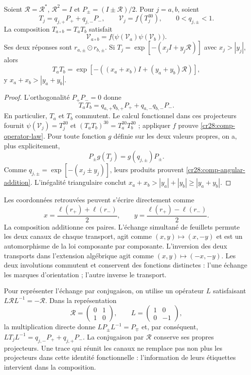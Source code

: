 \begin{proposition}
\label{cr28:comp-operator}
Soient $\mathcal R=\mathcal R^*$, $\mathcal R^2=I$ et
$P_\pm=(I\pm\mathcal R)/2$. Pour $j=a,b$, soient
\[
 T_j=q_{j,+}P_++q_{j,-}P_-,\qquad
 \mathcal V_j=f(T_j^{30}),\qquad 0<q_{j,\pm}<1.
\]
La composition $T_{a\circ b}=T_aT_b$ satisfait
\begin{equation}
 \mathcal V_{a\circ b}
 =f\bigl(\psi(\mathcal V_a)\psi(\mathcal V_b)\bigr).
 \label{cr28:comp-operator-law}
\end{equation}
Ses deux réponses sont $r_{a,\pm}\odot r_{b,\pm}$. Si
$T_j=\exp[-(x_jI+y_j\mathcal R)]$ avec $x_j>|y_j|$, alors
\begin{equation}
 T_aT_b=
 \exp[-((x_a+x_b)I+(y_a+y_b)\mathcal R)],
 \label{cr28:comp-angular-addition}
\end{equation}
y $x_a+x_b>|y_a+y_b|$.
\end{proposition}
\begin{proof}
L’orthogonalité $P_+P_-=0$ donne
\[
 T_aT_b=q_{a,+}q_{b,+}P_++q_{a,-}q_{b,-}P_-.
\]
En particulier, $T_a$ et $T_b$ commutent. Le calcul fonctionnel dans ces
projecteurs fournit
$\psi(\mathcal V_j)=T_j^{30}$ et
$(T_aT_b)^{30}=T_a^{30}T_b^{30}$ ; appliquer $f$ prouve
\eqref{cr28:comp-operator-law}. Pour toute fonction $g$ définie sur les
deux valeurs propres, on a, plus explicitement,
\[
 P_\pm g(T_j)=g(q_{j,\pm})P_\pm.
\]
Comme $q_{j,\pm}=\exp[-(x_j\pm y_j)]$, leurs produits prouvent
\eqref{cr28:comp-angular-addition}. L’inégalité triangulaire conclut
$x_a+x_b>|y_a|+|y_b|\geq|y_a+y_b|$.
\end{proof}

Les coordonnées retrouvées peuvent s’écrire directement comme
\[
 x=\frac{\ell(r_+)+\ell(r_-)}2,\qquad
 y=\frac{\ell(r_+)-\ell(r_-)}2.
\]
La composition additionne ces paires. L’échange simultané de feuillets
permute les deux canaux de chaque transport, agit comme
$(x,y)\mapsto(x,-y)$ et est un automorphisme de la loi composante par
composante. L’inversion des deux transports dans l’extension algébrique
agit comme $(x,y)\mapsto(-x,-y)$. Les deux involutions commutent et
conservent des fonctions distinctes : l’une échange les marques d’orientation ;
l’autre inverse le transport.

Pour représenter l’échange par conjugaison, on utilise un
opérateur $L$ satisfaisant $L\mathcal R L^{-1}=-\mathcal R$. Dans la
représentation
\[
 \mathcal R=\begin{pmatrix}0&1\\1&0\end{pmatrix},\qquad
 L=\begin{pmatrix}1&0\\0&-1\end{pmatrix},
\]
la multiplication directe donne $LP_\pm L^{-1}=P_\mp$ et, par conséquent,
$LT_jL^{-1}=q_{j,-}P_++q_{j,+}P_-$. La conjugaison par
$\mathcal R$ conserve ses propres projecteurs. Une trace qui réunit les
canaux ne remplace pas non plus les projecteurs dans cette identité fonctionnelle :
l’information de leurs étiquettes intervient dans la composition.

